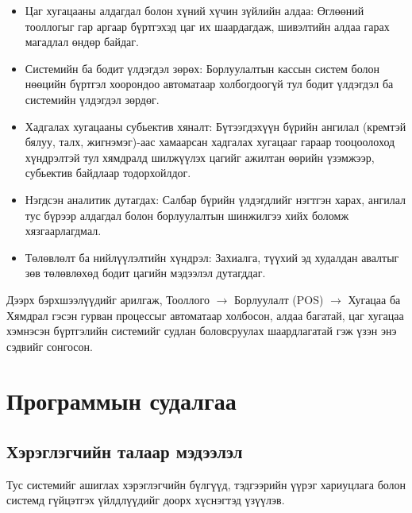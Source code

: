 \begin{itemize}
    \item Цаг хугацааны алдагдал болон хүний хүчин зүйлийн алдаа: Өглөөний тооллогыг гар аргаар бүртгэхэд цаг их шаардагдаж, шивэлтийн алдаа гарах магадлал өндөр байдаг.
    \item Системийн ба бодит үлдэгдэл зөрөх: Борлуулалтын кассын систем болон нөөцийн бүртгэл хоорондоо автоматаар холбогдоогүй тул бодит үлдэгдэл ба системийн үлдэгдэл зөрдөг.
    \item Хадгалах хугацааны субьектив хяналт: Бүтээгдэхүүн бүрийн ангилал (кремтэй бялуу, талх, жигнэмэг)-аас хамаарсан хадгалах хугацааг гараар тооцоолоход хүндрэлтэй тул хямдралд шилжүүлэх цагийг ажилтан өөрийн үзэмжээр, субьектив байдлаар тодорхойлдог.
    \item Нэгдсэн аналитик дутагдах: Салбар бүрийн үлдэгдлийг нэгтгэн харах, ангилал тус бүрээр алдагдал болон борлуулалтын шинжилгээ хийх боломж хязгаарлагдмал.
    \item Төлөвлөлт ба нийлүүлэлтийн хүндрэл: Захиалга, түүхий эд худалдан авалтыг зөв төлөвлөхөд бодит цагийн мэдээлэл дутагддаг.
\end{itemize}

Дээрх бэрхшээлүүдийг арилгаж, Тооллого $\rightarrow$ Борлуулалт (POS) $\rightarrow$ Хугацаа ба Хямдрал гэсэн гурван процессыг автоматаар холбосон, алдаа багатай, цаг хугацаа хэмнэсэн бүртгэлийн системийг судлан боловсруулах шаардлагатай гэж үзэн энэ сэдвийг сонгосон.

\section{Программын судалгаа}
\subsection{Хэрэглэгчийн талаар мэдээлэл }
Тус системийг ашиглах хэрэглэгчийн бүлгүүд, тэдгээрийн үүрэг хариуцлага болон системд гүйцэтгэх үйлдлүүдийг доорх хүснэгтэд үзүүлэв. 


